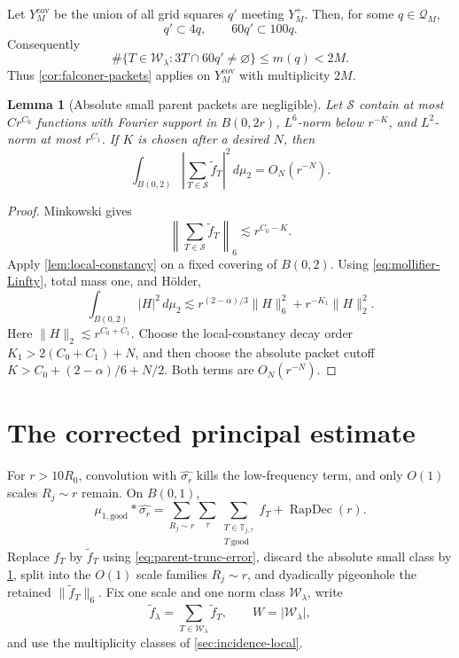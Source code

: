 \documentclass[11pt,letterpaper]{amsart}
\newtheorem{lemma}[lemma]{Lemma}
\newcommand{\RapDec}{\operatorname{RapDec}}
\newcommand{\wh}{\widehat}
\newcommand{\cW}{\mathcal{W}}
\newcommand{\cQ}{\mathcal{Q}}
\newcommand{\cS}{\mathcal{S}}
\newcommand{\abs}[1]{\lvert#1\rvert}
\newcommand{\norm}[1]{\lVert#1\rVert}
\begin{document}
Let \(Y_M^{\mathrm{cov}}\) be the union of all grid squares \(q'\) meeting
\(Y_M^+\).  Then, for some \(q\in\cQ_M\),
\begin{equation}\label{eq:cover-four}
 q'\subset4q,\qquad 60q'\subset100q.
\end{equation}
Consequently
\begin{equation}\label{eq:direct-multiplicity}
 \#\{T\in\cW_\lambda:3T\cap60q'\ne\varnothing\}
 \le m(q)<2M.
\end{equation}
Thus \cref{cor:falconer-packets} applies on \(Y_M^{\mathrm{cov}}\) with
multiplicity \(2M\).

\begin{lemma}[Absolute small parent packets are negligible]
\label{lem:small-parents}
Let \(\cS\) contain at most \(Cr^{C_0}\) functions with Fourier support in
\(B(0,2r)\), \(L^6\)-norm below \(r^{-K}\), and
\(L^2\)-norm at most \(r^{C_1}\).  If \(K\) is chosen after a desired
\(N\), then
\[
 \int_{B(0,2)}
 \left|\sum_{T\in\cS}\widetilde f_T\right|^2\,d\mu_2
 =O_N(r^{-N}).
\]
\end{lemma}

\begin{proof}
Minkowski gives
\[
 \left\|\sum_{T\in\cS}\widetilde f_T\right\|_6
 \lesssim r^{C_0-K}.
\]
Apply \cref{lem:local-constancy} on a fixed covering of \(B(0,2)\).
Using \eqref{eq:mollifier-Linfty}, total mass one, and H\"older,
\[
 \int_{B(0,2)}|H|^2\,d\mu_2
 \lesssim r^{(2-\alpha)/3}\norm{H}_6^2
 +r^{-K_1}\norm{H}_2^2.
\]
Here \(\norm{H}_2\lesssim r^{C_0+C_1}\).  Choose the local-constancy
decay order \(K_1>2(C_0+C_1)+N\), and then choose the absolute packet
cutoff \(K>C_0+(2-\alpha)/6+N/2\).  Both terms are \(O_N(r^{-N})\).
\end{proof}

\section{The corrected principal estimate}
\label{sec:principal}

For \(r>10R_0\), convolution with \(\wh{\sigma_r}\) kills the
low-frequency term, and only \(O(1)\) scales \(R_j\sim r\) remain.
On \(B(0,1)\),
\[
 \mu_{1,\mathrm{good}}*\wh{\sigma_r}
 =\sum_{R_j\sim r}\sum_\tau
   \sum_{\substack{T\in\mathbb T_{j,\tau}\\T\ \mathrm{good}}}
   f_T+\RapDec(r).
\]
Replace \(f_T\) by \(\widetilde f_T\) using
\eqref{eq:parent-trunc-error}, discard the absolute small class by
\cref{lem:small-parents}, split into the \(O(1)\) scale families
\(R_j\sim r\), and dyadically pigeonhole the retained
\(\norm{\widetilde f_T}_6\).  Fix one scale and one norm class
\(\cW_\lambda\), write
\[
 \widetilde f_\lambda
 =\sum_{T\in\cW_\lambda}\widetilde f_T,
 \qquad W=\abs{\cW_\lambda},
\]
and use the multiplicity classes of \cref{sec:incidence-local}.
\end{document}

